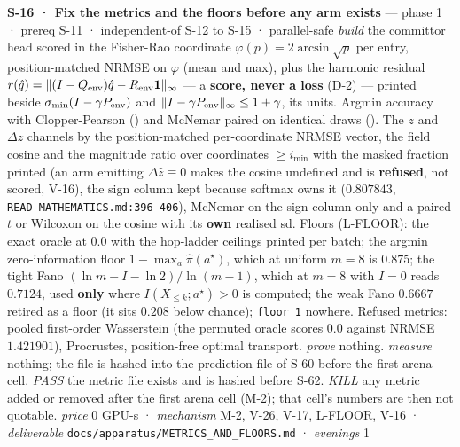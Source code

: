 \documentclass[11pt,a4paper]{article}
\theoremstyle{plain}
\theoremstyle{definition}
\theoremstyle{remark}
\begin{document}
\textbf{S-16 · Fix the metrics and the floors before any arm exists} ---
phase 1 · prereq S-11 · independent-of S-12 to S-15 · parallel-safe
\emph{build} the committor head scored in the Fisher-Rao coordinate
\(\varphi(p)=2\arcsin\sqrt p\) per entry, position-matched NRMSE on
\(\varphi\) (mean and max), plus the harmonic residual
\(r(\hat q)=\|(I-Q_{\rm env})\hat q-R_{\rm env}\mathbf 1\|_\infty\) ---
a \textbf{score, never a loss} (D-2) --- printed beside
\(\sigma_{\min}(I-\gamma P_{\rm env})\) and
\(\|I-\gamma P_{\rm env}\|_\infty\le1+\gamma\), its units. Argmin
accuracy with Clopper-Pearson (\citep{clopper-1934-binomial}) and
McNemar paired on identical draws (\citep{mcnemar-1947-correlated}). The
\(z\) and \(\Delta z\) channels by the position-matched per-coordinate
NRMSE vector, the field cosine and the magnitude ratio over coordinates
\(\ge i_{\min}\) with the masked fraction printed (an arm emitting
\(\Delta\hat z\equiv0\) makes the cosine undefined and is
\textbf{refused}, not scored, V-16), the sign column kept because
softmax owns it (\(0.807843\), \texttt{READ\ MATHEMATICS.md:396-406}),
McNemar on the sign column only and a paired \(t\) or Wilcoxon on the
cosine with its \textbf{own} realised sd. Floors (L-FLOOR): the exact
oracle at \(0.0\) with the hop-ladder ceilings printed per batch; the
argmin zero-information floor \(1-\max_a\hat\pi(a^\star)\), which at
uniform \(m=8\) is \(0.875\); the tight Fano
\((\ln m-I-\ln2)/\ln(m-1)\), which at \(m=8\) with \(I=0\) reads
\(0.7124\), used \textbf{only} where \(I(X_{\le k};a^\star)>0\) is
computed; the weak Fano \(0.6667\) retired as a floor (it sits \(0.208\)
below chance); \texttt{floor\_1} nowhere. Refused metrics: pooled
first-order Wasserstein (the permuted oracle scores \(0.0\) against
NRMSE \(1.421901\)), Procrustes, position-free optimal transport.
\emph{prove} nothing. \emph{measure} nothing; the file is hashed into
the prediction file of S-60 before the first arena cell. \emph{PASS} the
metric file exists and is hashed before S-62. \emph{KILL} any metric
added or removed after the first arena cell (M-2); that cell's numbers
are then not quotable. \emph{price} \(0\) GPU-s · \emph{mechanism} M-2,
V-26, V-17, L-FLOOR, V-16 · \emph{deliverable}
\texttt{docs/apparatus/METRICS\_AND\_FLOORS.md} · \emph{evenings} 1
\end{document}
